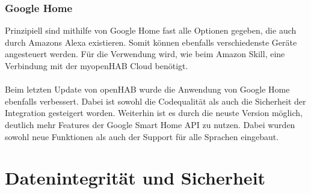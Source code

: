 \subsubsection{Google Home}

Prinzipiell sind mithilfe von Google Home fast alle Optionen gegeben, die auch durch Amazons Alexa existieren. Somit können ebenfalls verschiedenste Geräte angesteuert werden. Für die Verwendung wird, wie beim Amazon Skill, eine Verbindung mit der myopenHAB Cloud benötigt.\\
\\
Beim letzten Update von openHAB wurde die Anwendung von Google Home ebenfalls verbessert. Dabei ist sowohl die Codequalität als auch die Sicherheit der Integration gesteigert worden. Weiterhin ist es durch die neuste Version möglich, deutlich mehr Features der Google Smart Home API zu nutzen. Dabei wurden sowohl neue Funktionen als auch der Support für alle Sprachen eingebaut.\cite{OPENHAB02:OH}\cite{GOOGLEH01:GH}

\section{Datenintegrität und Sicherheit}

